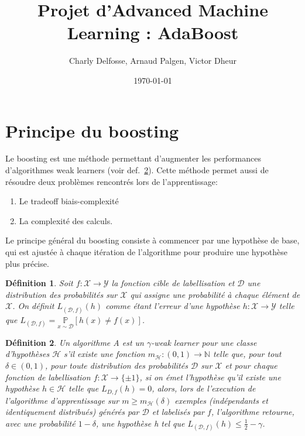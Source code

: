 \documentclass[12pt]{article}
\title{Projet d'Advanced Machine Learning : AdaBoost}
\date{\today}
\author{Charly Delfosse, Arnaud Palgen, Victor Dheur}
\newtheorem{definition}{Définition}
\begin{document}
	\maketitle
	
	\section{Principe du boosting}
	
	Le boosting est une méthode permettant d'augmenter les performances\\ d'algorithmes weak learners (voir def.~\ref{def:weaklearner}). Cette méthode permet aussi de résoudre deux problèmes
	rencontrés lors de l'apprentissage:
	\begin{enumerate}
		\item Le tradeoff biais-complexité
		\item La complexité des calculs.
	\end{enumerate}
	Le principe général du boosting consiste à commencer par une hypothèse de base,
	qui est ajustée à chaque itération de l'algorithme pour produire une hypothèse plus précise.
	
	
	\begin{definition}
	Soit $f: \mathcal{X} \rightarrow \mathcal{Y}$ la fonction cible de labellisation et $\mathcal{D}$ une distribution des probabilités sur $\mathcal{X}$ qui assigne une probabilité à chaque élément de $\mathcal{X}$. On définit $L_{(\mathcal{D},f)}(h)$ comme étant l'erreur d'une hypothèse $h: \mathcal{X} \rightarrow \mathcal{Y}$ telle que $L_{(\mathcal{D},f)} = \underset{x \sim \mathcal{D}}{\mathbb{P}} [h(x) \neq f(x)]$.
	\end{definition}	
	
	\begin{definition} Un algorithme \textit{A} est un $\gamma$-weak learner pour une classe d'hypothèses $\mathcal{H}$ s'il existe une fonction $m_{\mathcal{H}}: (0,1) \rightarrow \mathbb{N}$ telle que, pour tout $\delta \in (0,1)$, pour toute distribution des probabilités $\mathcal{D}$ sur $\mathcal{X}$ et pour chaque fonction de labellisation $f:\mathcal{X} \rightarrow \{\pm 1\}$, si on émet l'hypothèse qu'il existe une hypothèse $h \in \mathcal H$ telle que $L_{D,f}(h)=0$, alors, lors de l'execution de l'algorithme d'apprentissage sur $m \geq m_{\mathcal{H}}(\delta)$ exemples (indépendants et identiquement distribués) générés par $\mathcal{D}$ et labelisés par $f$, l'algorithme retourne, avec une probabilité $1- \delta$, une hypothèse \textit{h} tel que $L_{(\mathcal{D}, f)}(h) \leq \frac{1}{2} - \gamma$.
		\label{def:weaklearner}
	\end{definition}
	
\end{document}
